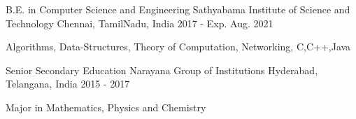 

\begin{cventries}

  \cventry
    {B.E. in Computer Science and Engineering} %
    {Sathyabama Institute of Science and Technology} %
    {Chennai, TamilNadu, India} %
    {2017 - Exp. Aug. 2021} %
    {
      \begin{cvitems} %
        \item {Algorithms, Data-Structures, Theory of Computation, Networking, C,C++,Java}
      \end{cvitems}
    }

  \cventry
    {Senior Secondary Education} %
    {Narayana Group of Institutions} %
    {Hyderabad, Telangana, India} %
    {2015 - 2017} %
    {
      \begin{cvitems} %
        \item {Major in Mathematics, Physics and Chemistry}
      \end{cvitems}
    }

\end{cventries}
